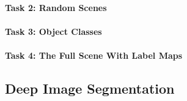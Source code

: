 \documentclass[12pt,fleqn]{article}
\begin{document}
\paragraph{Task 2: Random Scenes}
\paragraph{Task 3: Object Classes}
\paragraph{Task 4: The Full Scene With Label Maps}

\subsection{Deep Image Segmentation}
\end{document}
